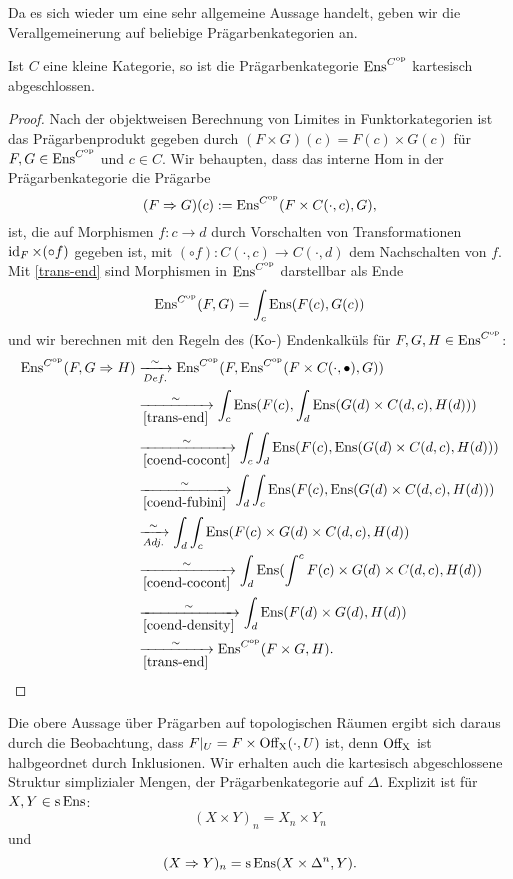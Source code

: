 Da es sich wieder um eine sehr allgemeine Aussage handelt, geben wir
die Verallgemeinerung auf beliebige Prägarbenkategorien an.
\begin{prop}
  Ist $C$ eine kleine Kategorie, so ist die Prägarbenkategorie
  $\operatorname{Ens}^{C^\mathrm{op}}$ kartesisch abgeschlossen.
\end{prop}
\begin{proof}
  Nach der objektweisen Berechnung von Limites in Funktorkategorien
  ist das Prägarbenprodukt gegeben durch $(F \times G)(c) = F(c)
  \times G(c)$ für $F, G \in \operatorname{Ens}^{C^\mathrm{op}}$ und $c \in C$. Wir
  behaupten, dass das interne Hom in der Prägarbenkategorie die
  Prägarbe
  \[ (F \Rightarrow G)(c) := \operatorname{Ens}^{C^\mathrm{op}}(F \times C(\cdot, c), G), \]
  ist, die auf Morphismen $f: c \to d$ durch Vorschalten von
  Transformationen $\operatorname{id}_F \times (\circ f)$ gegeben ist, mit $(\circ
  f): C(\cdot, c) \to C(\cdot, d)$ dem Nachschalten von $f$. Mit
  \ref{trans-end} sind Morphismen in $\operatorname{Ens}^{C^\mathrm{op}}$ darstellbar als
  Ende
  \[ \operatorname{Ens}^{C^\mathrm{op}}(F, G) = \int_c \operatorname{Ens}(F(c), G(c)) \]
  und wir berechnen mit den Regeln des (Ko-) Endenkalküls für $F, G, H
  \in \operatorname{Ens}^{C^\mathrm{op}}$:
  \begin{align*}
    \operatorname{Ens}^{C^\mathrm{op}}(F, G \Rightarrow H)
    &\xrightarrow[Def.]{\sim} \operatorname{Ens}^{C^\mathrm{op}}(F, \operatorname{Ens}^{C^\mathrm{op}}(F \times C(\cdot, \bullet), G)) \\
    &\xrightarrow[\ref{trans-end}]{\sim}
     \int_c \operatorname{Ens}(F(c), \int_d \operatorname{Ens}(G(d) \times C(d, c), H(d))) \\
    &\xrightarrow[\ref{coend-cocont}]{\sim}
     \int_c \int_d \operatorname{Ens}(F(c), \operatorname{Ens}(G(d) \times C(d, c), H(d))) \\
    &\xrightarrow[\ref{coend-fubini}]{\sim}
     \int_d \int_c \operatorname{Ens}(F(c), \operatorname{Ens}(G(d) \times  C(d, c), H(d))) \\
    &\xrightarrow[Adj.]{\sim} \int_d \int_c \operatorname{Ens}(F(c) \times G(d) \times C(d, c), H(d)) \\
    &\xrightarrow[\ref{coend-cocont}]{\sim}
     \int_d \operatorname{Ens}( \int^c F(c) \times G(d) \times C(d, c), H(d)) \\
    &\xrightarrow[\ref{coend-density}]{\sim}
     \int_d \operatorname{Ens}( F(d) \times G(d), H(d)) \\
    &\xrightarrow[\ref{trans-end}]{\sim}
     \operatorname{Ens}^{C^\mathrm{op}}(F \times G, H).
  \end{align*}
\end{proof}
Die obere Aussage über Prägarben auf topologischen Räumen ergibt sich
daraus durch die Beobachtung, dass $F|_U = F \times \operatorname{Off_X}(\cdot, U)$
ist, denn $\operatorname{Off_X}$ ist halbgeordnet durch Inklusionen. Wir erhalten
auch die kartesisch abgeschlossene Struktur simplizialer Mengen, der
Prägarbenkategorie auf $\Delta$. Explizit ist für $X, Y \in \operatorname{s}\operatorname{Ens}$:
\[ (X \times Y)_n = X_n \times Y_n \]
und
\[ (X \Rightarrow Y)_n = \operatorname{s}\operatorname{Ens}(X \times \Delta^n, Y). \]

